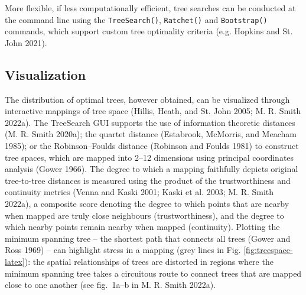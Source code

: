More flexible, if less computationally efficient, tree searches can be conducted
at the command line using the \texttt{TreeSearch()}, \texttt{Ratchet()} and \texttt{Bootstrap()}
commands, which support custom tree optimality criteria (e.g. Hopkins and St. John 2021).

\hypertarget{visualization}{%
\subsection{Visualization}\label{visualization}}

The distribution of optimal trees, however obtained, can be visualized through
interactive mappings of tree space (Hillis, Heath, and St. John 2005; M. R. Smith 2022a). The TreeSearch GUI supports the use of information theoretic distances
(M. R. Smith 2020a); the quartet distance (Estabrook, McMorris, and Meacham 1985); or the Robinson--Foulds
distance (Robinson and Foulds 1981) to construct tree spaces, which are mapped into 2--12
dimensions using principal coordinates analysis (Gower 1966). The degree to
which a mapping faithfully depicts original tree-to-tree distances is measured
using the product of the trustworthiness and continuity metrics (Venna and Kaski 2001; Kaski et al. 2003; M. R. Smith 2022a), a composite score denoting the degree to which points
that are nearby when mapped are truly close neighbours (trustworthiness), and
the degree to which nearby points remain nearby when mapped (continuity).
Plotting the minimum spanning tree -- the shortest path that connects all trees
(Gower and Ross 1969) -- can highlight stress in a mapping (grey lines in Fig.
\ref{fig:treespace-latex}): the spatial relationships of trees are distorted in
regions where the minimum spanning tree takes a circuitous route to connect
trees that are mapped close to one another (see fig.~1a--b in M. R. Smith 2022a).

